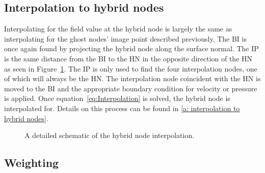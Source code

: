 \documentclass[onehalf,11pt]{beavtex}
\begin{document}
\subsection{Interpolation to hybrid nodes}
\label{Sec:Interpolation}

Interpolating for the field value at the hybrid node is largely the same as interpolating for the ghost nodes' image point described previously.
The BI is once again found by projecting the hybrid node along the surface normal.
The IP is the same distance from the BI to the HN in the opposite direction of the HN as seen in Figure~\ref{fig:Interpolate}.
The IP is only used to find the four interpolation nodes, one of which will always be the HN.
The interpolation node coincident with the HN is moved to the BI and the appropriate boundary condition for velocity or pressure is applied.
Once equation~\eqref{eq:Interpolation} is solved, the hybrid node is interpolated for.
Details on this process can be found in \ref{a: interpolation to hybrid nodes}.
\begin{figure}[htb]
	\centering
	
	\caption{A detailed schematic of the hybrid node interpolation.}
	\label{fig:Interpolate}
\end{figure}

\subsection{Weighting}
\label{Sec:Weighting}
\end{document}

